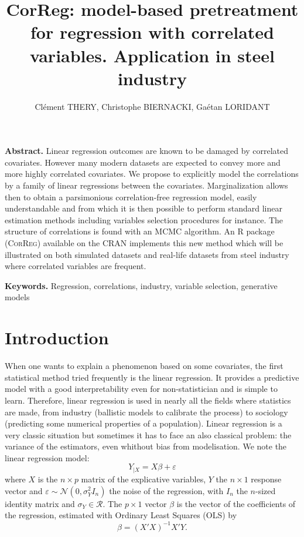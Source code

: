 \documentclass[11pt,a4paper]{article}
\author{Clément THERY, Christophe BIERNACKI, Gaétan LORIDANT}
\title{CorReg: model-based pretreatment for regression with correlated variables. Application in steel industry}
\begin{document}
\maketitle
\bigskip
{\bf Abstract.} Linear regression outcomes are known to be damaged by correlated covariates. However many modern datasets are expected to convey more and more highly correlated covariates. We propose to explicitly model the correlations by a family of linear regressions between the covariates. Marginalization allows then to obtain a parsimonious correlation-free regression model, easily understandable and from which it is then possible to perform standard linear estimation methods including variables selection procedures for instance. The structure of correlations is found with an MCMC algorithm. An R package (\textsc{CorReg}) available on the CRAN implements this new method which will be illustrated on both simulated datasets and real-life datasets from steel industry where correlated variables are frequent.
\smallskip

{\bf Keywords.} Regression, correlations, industry, variable selection, generative models

\section{Introduction}


When one wants to explain a phenomenon based on some covariates, the first statistical method tried frequently is the linear regression. It provides a predictive model with a good interpretability even  for non-statistician and is simple to learn. Therefore, linear regression is used in nearly all the fields where statistics are made, from industry (ballistic models to calibrate the process) to sociology (predicting some numerical properties of a population).
Linear regression is a very classic situation but sometimes it has to face an also classical problem: the variance of the estimators, even whithout bias from modelisation. 
We note the linear regression model:
\begin{equation}
		Y_{|X}=X\beta + \varepsilon
	\end{equation}
	where $X$ is the $n\times p$ matrix of the explicative variables, $Y$ the  $n\times 1$ response vector and $\varepsilon \sim \mathcal{N}(0,\sigma_Y^2I_n)$ the noise of the regression, with $I_n$ the $n$-sized identity matrix and $\sigma_Y \in \mathcal{R}$. The $p\times 1$ vector $\beta$ is the vector of the coefficients of the regression, estimated with Ordinary Least Squares (OLS) by \cite{saporta2006probabilites} 
	\begin{equation}
		\hat{\beta}=(X'X)^{-1}X'Y.
\end{equation}		
\end{document}
